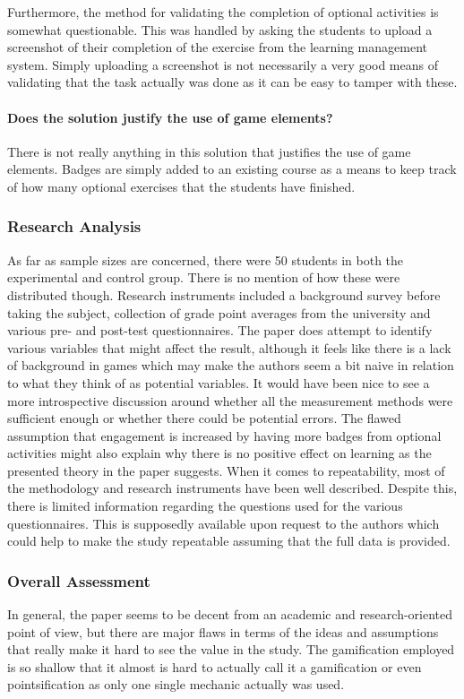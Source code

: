 Furthermore, the method for validating the completion of optional activities is somewhat questionable. This was handled by asking the students to upload a screenshot of their completion of the exercise from the learning management system. Simply uploading a screenshot is not necessarily a very good means of validating that the task actually was done as it can be easy to tamper with these. 

\paragraph{Does the solution justify the use of game elements?}
There is not really anything in this solution that justifies the use of game elements. Badges are simply added to an existing course as a means to keep track of how many optional exercises that the students have finished.  

\subsubsection{Research Analysis}
As far as sample sizes are concerned, there were 50 students in both the experimental and control group. There is no mention of how these were distributed though. Research instruments included a background survey before taking the subject, collection of grade point averages from the university and various pre- and post-test questionnaires. 
The paper does attempt to identify various variables that might affect the result, although it feels like there is a lack of background in games which may make the authors seem a bit naive in relation to what they think of as potential variables. It would have been nice to see a more introspective discussion around whether all the measurement methods were sufficient enough or whether there could be potential errors. The flawed assumption that engagement is increased by having more badges from optional activities might also explain why there is no positive effect on learning as the presented theory in the paper suggests. 
When it comes to repeatability, most of the methodology and research instruments have been well described. Despite this, there is limited information regarding the questions used for the various questionnaires. This is supposedly available upon request to the authors which could help to make the study repeatable assuming that the full data is provided. 

\subsubsection{Overall Assessment}
In general, the paper seems to be decent from an academic and research-oriented point of view, but there are major flaws in terms of the ideas and assumptions that really make it hard to see the value in the study. The gamification employed is so shallow that it almost is hard to actually call it a gamification or even pointsification as only one single mechanic actually was used. 







